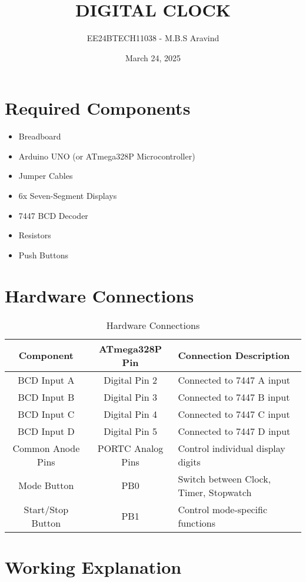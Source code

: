 \documentclass{article}
\title{\textbf{DIGITAL CLOCK}}
\author{EE24BTECH11038 - M.B.S Aravind}
\date{March 24, 2025}
\begin{document}
\maketitle

\tableofcontents

\section{Required Components}
\begin{itemize}
    \item Breadboard
    \item Arduino UNO (or ATmega328P Microcontroller)
    \item Jumper Cables
    \item 6x Seven-Segment Displays
    \item 7447 BCD Decoder
    \item Resistors
    \item Push Buttons
\end{itemize}

\section{Hardware Connections}
\begin{table}[h]
    \centering
    \begin{tabular}{|c|c|l|}
        \hline
        \textbf{Component} & \textbf{ATmega328P Pin} & \textbf{Connection Description} \\
        \hline
        BCD Input A & Digital Pin 2 & Connected to 7447 A input \\
        BCD Input B & Digital Pin 3 & Connected to 7447 B input \\
        BCD Input C & Digital Pin 4 & Connected to 7447 C input \\
        BCD Input D & Digital Pin 5 & Connected to 7447 D input \\
        Common Anode Pins & PORTC Analog Pins & Control individual display digits \\
        Mode Button & PB0 & Switch between Clock, Timer, Stopwatch \\
        Start/Stop Button & PB1 & Control mode-specific functions \\
        \hline
    \end{tabular}
    \caption{Hardware Connections}
\end{table}

\section{Working Explanation}
\end{document}
